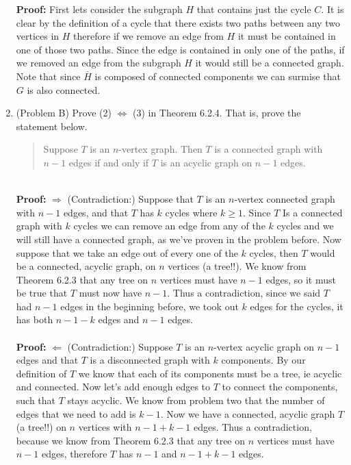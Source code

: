 \documentclass{amsart}
\begin{document}
\begin{enumerate}
\textbf{Proof:} First lets consider the subgraph $H$ that contains just the cycle $C$. It is clear by the definition of a cycle that there exists two paths between any two vertices in $H$ therefore if we remove an edge from $H$ it must be contained in one of those two paths. Since the edge is contained in only one of the paths, if we removed an edge from the subgraph $H$ it would still be a connected graph. Note that since $\overline{H}$ is composed of connected components we can surmise that $G$ is also connected.

\vspace{.5in}

\item (Problem B) Prove (2) $\Longleftrightarrow$ (3) in Theorem 6.2.4. That is, prove the statement below.
\begin{quote} Suppose $T$ is an $n$-vertex graph. Then $T$ is a connected graph with $n-1$ edges if and only if $T$ is an acyclic graph on $n-1$ edges.
\end{quote}\\

\textbf{Proof:} $\Longrightarrow$ (Contradiction:) Suppose that $T$ is an $n$-vertex connected graph with $n-1$ edges, and that $T$ has $k$ cycles where $k\geq1$. Since $T$ Is a connected graph with $k$ cycles we can remove an edge from any of the $k$ cycles and we will still have a connected graph, as we've proven in the problem before. Now suppose that we take an edge out of every one of the $k$ cycles, then $T$ would be a connected, acyclic graph, on $n$ vertices (a tree!!). We know from Theorem 6.2.3 that any tree on $n$ vertices must have $n-1$ edges, so it must be true that $T$ must now have $n-1$. Thus a contradiction, since we said $T$ had $n-1$ edges in the beginning before, we took out $k$ edges for the cycles, it has both $n-1-k$ edges and $n-1$ edges. \\\\

\textbf{Proof:} $\Longleftarrow$ (Contradiction:) Suppose $T$ is an $n$-vertex acyclic graph on $n-1$ edges and that $T$ is a disconnected graph with $k$ components. By our definition of $T$ we know that each of its components must be a tree, ie acyclic and connected. Now let's add enough edges to $T$ to connect the components, such that $T$ stays acyclic. We know from problem two that the number of edges that we need to add is $k-1$. Now we have a connected, acyclic graph $T$ (a tree!!) on $n$ vertices with $n-1+k-1$ edges. Thus a contradiction, because we know from Theorem 6.2.3 that any tree on $n$ vertices must have $n-1$ edges, therefore $T$ has $n-1$ and $n-1+k-1$ edges.

\vspace{1in}

\end{enumerate}
\end{document}
